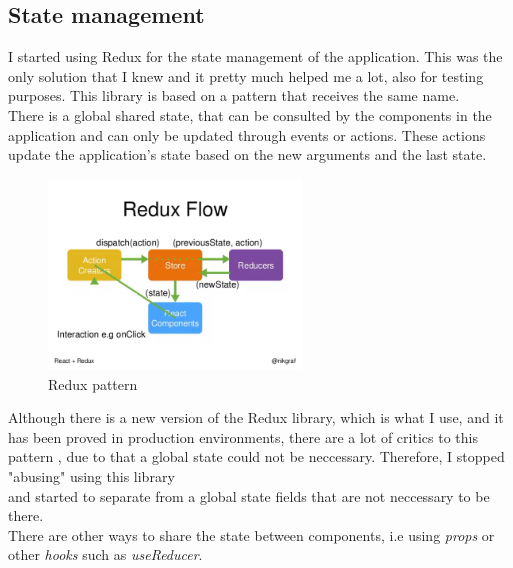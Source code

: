     \subsection{State management}
    I started using Redux \cite{Redux} for the state management of the application. This was the only solution that I knew and it pretty much helped me a lot, also for testing purposes. This library is based on a pattern that receives the same name. \\
    There is a global shared state, that can be consulted by the components in the application and can only be updated through events or actions. These actions update the application's state based on the new arguments and the last state. \\
    \begin{figure}[H]
        \centering
            \includegraphics[width=0.6\textwidth]{assets/diagrams/redux.png}
        \caption{Redux pattern}
        \label{fig:Redux pattern}
    \end{figure}

    Although there is a new version of the Redux library, which is what I use, and it has been proved in production environments, there are a lot of critics to this pattern \cite{NoRedux}, due to that a global state could not be neccessary. Therefore, I stopped "abusing" using this library \\
    and started to separate from a global state fields that are not neccessary to be there. \\
    There are other ways to share the state between components, i.e using \textit{props} or other \textit{hooks} such as \textit{useReducer}. \\

